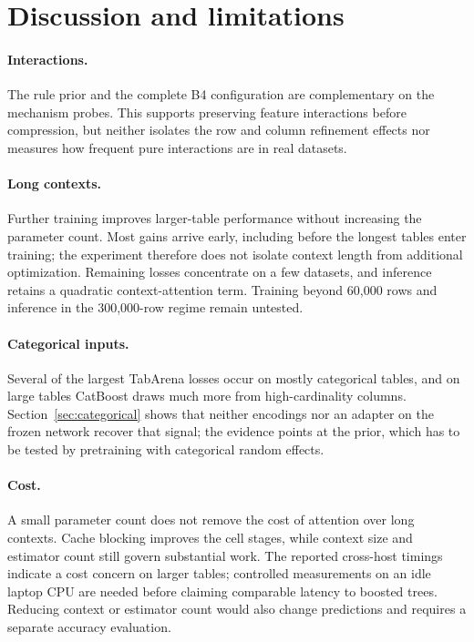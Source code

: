 \documentclass[11pt]{article}
\begin{document}
\FloatBarrier
\section{Discussion and limitations}

\paragraph{Interactions.} The rule prior and the complete B4 configuration are complementary on the
mechanism probes. This supports preserving feature interactions before compression, but neither
isolates the row and column refinement effects nor measures how frequent pure interactions are in
real datasets.

\paragraph{Long contexts.} Further training improves larger-table performance without increasing the
parameter count. Most gains arrive early, including before the longest tables enter training; the
experiment therefore does not isolate context length from additional optimization. Remaining losses
concentrate on a few datasets, and inference retains a quadratic context-attention term. Training beyond
60,000 rows and inference in the 300,000-row regime remain untested.

\paragraph{Categorical inputs.} Several of the largest TabArena losses occur on mostly categorical
tables, and on large tables CatBoost draws much more from high-cardinality columns. Section~\ref{sec:categorical}
shows that neither encodings nor an adapter on the frozen network recover that signal; the evidence points at the
prior, which has to be tested by pretraining with categorical random effects.

\paragraph{Cost.} A small parameter count does not remove the cost of attention over long contexts.
Cache blocking improves the cell stages, while context size and estimator count still govern substantial
work. The reported cross-host timings indicate a cost concern on larger tables; controlled measurements
on an idle laptop CPU are needed before claiming comparable latency to boosted trees. Reducing context
or estimator count would also change predictions and requires a separate accuracy evaluation.
\end{document}
